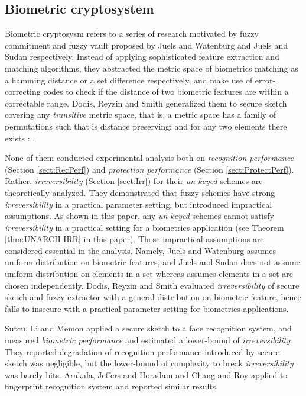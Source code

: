 \subsection{Biometric cryptosystem}
Biometric cryptosysm refers to a series of research motivated by fuzzy commitment and fuzzy vault proposed by Juels and Watenburg\cite{Juels:1999kz} and Juels and Sudan\cite{Juels:2002hd} respectively. Instead of applying sophisticated feature extraction and matching algorithms, they abstracted the metric space of biometrics matching as a hamming distance or a set difference respectively, and make use of error-correcting codes to check if the distance of two biometric features are within a correctable range. Dodis, Reyzin and Smith\cite{Dodis:2004uh} generalized them to secure sketch covering any {\it transitive} metric space, that is, a metric space  has a family of permutations  such that  is distance preserving:  and for any two elements  there exists : . 

None of them conducted experimental analysis both on  {\it recognition performance} (Section \ref{sect:RecPerf}) and {\it protection performance} (Section \ref{sect:ProtectPerf}). Rather, {\it irreversibility} (Section \ref{sect:Irr}) for their {\it un-keyed} schemes are theoretically analyzed. They demonstrated that fuzzy schemes have strong {\it irreversibility} in a practical parameter setting, but introduced impractical assumptions. As shown in this paper, any {\it un-keyed} schemes cannot satisfy {\it irreversibility} in a practical setting for a biometrics application (see Theorem \ref{thm:UNARCH-IRR} in this paper). Those impractical assumptions are considered essential in the analysis. Namely, Juels and Watenburg\cite{Juels:1999kz} assumes uniform distribution on biometric features, and Juels and Sudan\cite{Juels:2002hd} does not assume uniform distribution on elements in a set whereas assumes elements in a set are chosen independently. Dodis, Reyzin and Smith\cite{Dodis:2004uh} evaluated  {\it irreversibility} of secure sketch and fuzzy extractor with a general distribution on biometric feature, hence falls to insecure with a practical parameter setting for biometrics applications.

Sutcu, Li and Memon\cite{Sutcu:2007um} applied a secure sketch\cite{Dodis:2004uh} to a face recognition system, and measured {\it biometric performance} and estimated a lower-bound of {\it irreversibility}. They reported degradation of recognition performance introduced by secure sketch was negligible, but the lower-bound of complexity to break {\it irreversibility} was barely  bits. Arakala, Jeffers and Horadam\cite{Arakala:2007vv} and Chang and Roy\cite{Chang:2007wz} applied to fingerprint recognition system and reported similar results.


